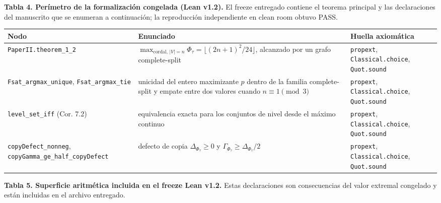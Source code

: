 \documentclass[
  spanish,
  11pt,
  a4paper,
]{article}
\newcounter{none} %
\begin{document}
\textbf{Tabla 4. Perímetro de la formalización congelada (Lean v1.2).} El freeze entregado contiene el teorema principal y las declaraciones del manuscrito que se enumeran a continuación; la reproducción independiente en clean room obtuvo PASS.

{\def\LTcaptype{none} %
\begin{longtable}[]{@{}
  >{\raggedright\arraybackslash}p{}
  >{\raggedright\arraybackslash}p{}
  >{\raggedright\arraybackslash}p{}@{}}
\toprule\noalign{}
\begin{minipage}[b]{\linewidth}\raggedright
Nodo
\end{minipage} & \begin{minipage}[b]{\linewidth}\raggedright
Enunciado
\end{minipage} & \begin{minipage}[b]{\linewidth}\raggedright
Huella axiomática
\end{minipage} \\
\midrule\noalign{}
\endhead
\bottomrule\noalign{}
\endlastfoot
\texttt{PaperII.theorem\_1\_2} & \(\max_{\text{cordal},\,|V|=n}\Phi_\tau=\lfloor(2n+1)^2/24\rfloor\), alcanzado por un grafo complete-split & \texttt{propext}, \texttt{Classical.choice}, \texttt{Quot.sound} \\
\texttt{Fsat\_argmax\_unique}, \texttt{Fsat\_argmax\_tie} & unicidad del entero maximizante \(p\) dentro de la familia complete-split y empate entre dos valores cuando \(n\equiv1\pmod3\) & \texttt{propext}, \texttt{Classical.choice}, \texttt{Quot.sound} \\
\texttt{level\_set\_iff} (Cor. 7.2) & equivalencia exacta para los conjuntos de nivel desde el máximo continuo & \texttt{propext}, \texttt{Classical.choice}, \texttt{Quot.sound} \\
\texttt{copyDefect\_nonneg}, \texttt{copyGamma\_ge\_half\_copyDefect} & defecto de copia \(\Delta_{\Phi_\tau}\ge0\) y \(\Gamma_{\Phi_\tau}\ge\Delta_{\Phi_\tau}/2\) & \texttt{propext}, \texttt{Classical.choice}, \texttt{Quot.sound} \\
\end{longtable}
}

\textbf{Tabla 5. Superficie aritmética incluida en el freeze Lean v1.2.} Estas declaraciones son consecuencias del valor extremal congelado y están incluidas en el archivo entregado.
\end{document}
